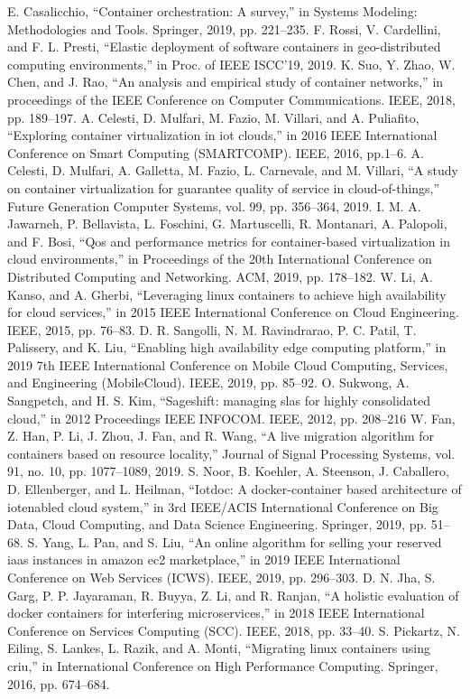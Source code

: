 \documentclass[conference]{IEEEtran}
\begin{document}
\begin{thebibliography}{00}
  E. Casalicchio, “Container orchestration: A survey,” in Systems Modeling: Methodologies and Tools. Springer, 2019, pp. 221–235.
 F. Rossi, V. Cardellini, and F. L. Presti, “Elastic deployment of software
containers in geo-distributed computing environments,” in Proc. of IEEE
ISCC’19, 2019.
  K. Suo, Y. Zhao, W. Chen, and J. Rao, “An analysis and empirical
study of container networks,” in proceedings of the IEEE Conference
on Computer Communications. IEEE, 2018, pp. 189–197.
  A. Celesti, D. Mulfari, M. Fazio, M. Villari, and A. Puliafito, “Exploring
container virtualization in iot clouds,” in 2016 IEEE International Conference on Smart Computing (SMARTCOMP). IEEE, 2016, pp.1–6.
  A. Celesti, D. Mulfari, A. Galletta, M. Fazio, L. Carnevale, and
M. Villari, “A study on container virtualization for guarantee quality
of service in cloud-of-things,” Future Generation Computer Systems,
vol. 99, pp. 356–364, 2019.
  I. M. A. Jawarneh, P. Bellavista, L. Foschini, G. Martuscelli, R. Montanari, A. Palopoli, and F. Bosi, “Qos and performance metrics for
container-based virtualization in cloud environments,” in Proceedings
of the 20th International Conference on Distributed Computing and
Networking. ACM, 2019, pp. 178–182.
  W. Li, A. Kanso, and A. Gherbi, “Leveraging linux containers to
achieve high availability for cloud services,” in 2015 IEEE International
Conference on Cloud Engineering. IEEE, 2015, pp. 76–83.
 D. R. Sangolli, N. M. Ravindrarao, P. C. Patil, T. Palissery, and K. Liu,
“Enabling high availability edge computing platform,” in 2019 7th IEEE
International Conference on Mobile Cloud Computing, Services, and
Engineering (MobileCloud). IEEE, 2019, pp. 85–92.
 O. Sukwong, A. Sangpetch, and H. S. Kim, “Sageshift: managing slas
for highly consolidated cloud,” in 2012 Proceedings IEEE INFOCOM.
IEEE, 2012, pp. 208–216
 W. Fan, Z. Han, P. Li, J. Zhou, J. Fan, and R. Wang, “A live migration
algorithm for containers based on resource locality,” Journal of Signal
Processing Systems, vol. 91, no. 10, pp. 1077–1089, 2019.
  S. Noor, B. Koehler, A. Steenson, J. Caballero, D. Ellenberger, and
L. Heilman, “Iotdoc: A docker-container based architecture of iotenabled cloud system,” in 3rd IEEE/ACIS International Conference on
Big Data, Cloud Computing, and Data Science Engineering. Springer,
2019, pp. 51–68.
 S. Yang, L. Pan, and S. Liu, “An online algorithm for selling your
reserved iaas instances in amazon ec2 marketplace,” in 2019 IEEE
International Conference on Web Services (ICWS). IEEE, 2019, pp.
296–303.
  D. N. Jha, S. Garg, P. P. Jayaraman, R. Buyya, Z. Li, and R. Ranjan, “A
holistic evaluation of docker containers for interfering microservices,”
in 2018 IEEE International Conference on Services Computing (SCC).
IEEE, 2018, pp. 33–40.
 S. Pickartz, N. Eiling, S. Lankes, L. Razik, and A. Monti, “Migrating
linux containers using criu,” in International Conference on High
Performance Computing. Springer, 2016, pp. 674–684.
\end{thebibliography}
\end{document}
